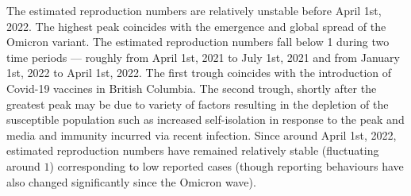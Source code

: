 The estimated reproduction numbers are relatively unstable before April 1st,
2022. The highest peak coincides with the emergence and global spread of the
Omicron variant. The estimated reproduction numbers fall below 1 during two time
periods --- roughly from April 1st, 2021 to July 1st, 2021 and from January 1st,
2022 to April 1st, 2022. The first trough coincides with the introduction of
Covid-19 vaccines in British Columbia. The second trough, shortly after the
greatest peak may be due to variety of factors resulting in the depletion of the
susceptible population such as increased self-isolation in response to the peak
and media and immunity incurred via recent infection. Since around April 1st,
2022, estimated reproduction numbers have remained relatively stable
(fluctuating around $1$) corresponding to low reported cases (though reporting
behaviours have also changed significantly since the Omicron wave). 


